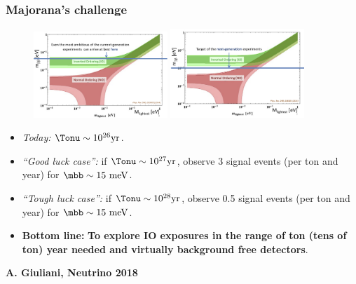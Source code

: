 \begin{frame}
\frametitle{Majorana's challenge}

\begin{figure}[tbh!]
  \begin{center}
      \includegraphics[width=0.45\textwidth]{moriond/current_experiments.png}
       \includegraphics[width=0.45\textwidth]{moriond/nextgen_experiments.png}
      
  \end{center}
\end{figure}
\begin{itemize}
\item {\em Today:} $\Tonu \sim 10^{26} {\rm yr}$.
\item {\em ``Good luck case'':} if $\Tonu \sim 10^{27} {\rm yr}$, observe 3 signal events (per ton and year)  for
$\mbb \sim 15 {\rm ~ meV}$.
\item {\em ``Tough luck case'':} if $\Tonu \sim 10^{28} {\rm yr}$, observe 0.5 signal events (per ton and year) for
$\mbb \sim 15 {\rm ~meV}$.
\item {\bf Bottom line:} {\bf To explore IO exposures in the range of ton (tens of ton) year needed and virtually background free detectors}. 
\end{itemize}
 \begin{flushright}
{\bf A. Giuliani, Neutrino 2018}
\end{flushright}
\end{frame}

